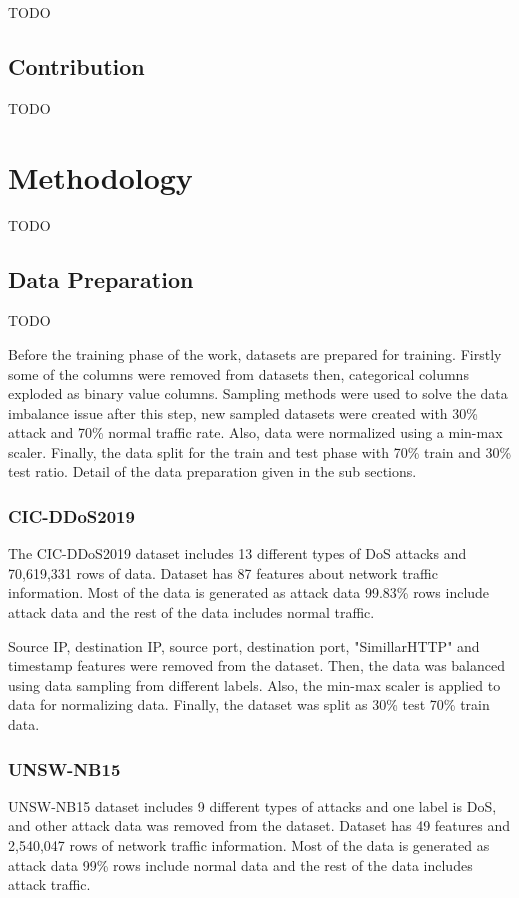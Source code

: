 \documentclass{article}
\begin{document}
TODO

\subsection{Contribution}

TODO

\section{Methodology}

TODO

\subsection{Data Preparation}

TODO

Before the training phase of the work, datasets are prepared for training. Firstly some of the columns were removed from datasets then, categorical columns exploded as binary value columns. Sampling methods were used to solve the data imbalance issue after this step, new sampled datasets were created with 30\% attack and 70\% normal traffic rate. Also, data were normalized using a min-max scaler. Finally, the data split for the train and test phase with 70\% train and 30\% test ratio. Detail of the data preparation given in the sub sections.  

\subsubsection{CIC-DDoS2019}
The CIC-DDoS2019 dataset includes 13 different types of DoS attacks and 70,619,331 rows of data. Dataset has 87 features about network traffic information. Most of the data is generated as attack data 99.83\% rows include attack data and the rest of the data includes normal traffic.

Source IP, destination IP, source port, destination port, "SimillarHTTP" and timestamp features were removed from the dataset. Then, the data was balanced using data sampling from different labels. Also, the min-max scaler is applied to data for normalizing data. Finally, the dataset was split as 30\% test 70\% train data.


\subsubsection{UNSW-NB15}
UNSW-NB15 dataset includes 9 different types of attacks and one label is DoS, and other attack data was removed from the dataset. Dataset has 49 features and 2,540,047 rows of network traffic information. Most of the data is generated as attack data 99\% rows include normal data and the rest of the data includes attack traffic.
\end{document}

